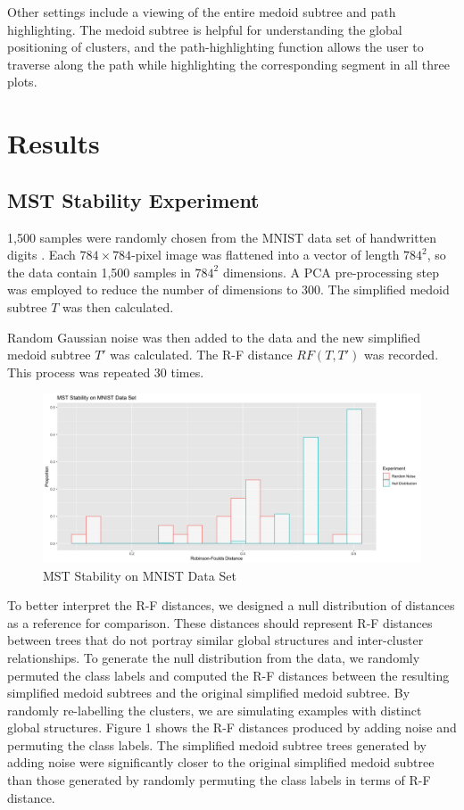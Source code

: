 \documentclass{article}
\begin{document}
Other settings include a viewing of the entire medoid subtree and path highlighting. The medoid subtree is helpful for understanding the global positioning of clusters, and the path-highlighting function allows the user to traverse along the path while highlighting the corresponding segment in all three plots.

\section{Results}

\subsection{MST Stability Experiment}
1,500 samples were randomly chosen from the MNIST data set of handwritten digits \cite{MNIST}. Each $784 \times 784$-pixel image was flattened into a vector of length $784^2$, so the data contain 1,500 samples in $784^2$ dimensions. A PCA pre-processing step was employed to reduce the number of dimensions to 300. The simplified medoid subtree $T$ was then calculated.

Random Gaussian noise was then added to the data and the new simplified medoid subtree $T'$ was calculated. The R-F distance $RF(T, T')$ was recorded. This process was repeated 30 times.

\renewcommand{\figurename}{Figure}
\renewcommand{\thefigure}{1}
\begin{figure}[!t]
\centering
\includegraphics[scale=0.3]{RF stability}
\caption{MST Stability on MNIST Data Set}
\end{figure}

To better interpret the R-F distances, we designed a null distribution of distances as a reference for comparison. These distances should represent R-F distances between trees that do not portray similar global structures and inter-cluster relationships. To generate the null distribution from the data, we randomly permuted the class labels and computed the R-F distances between the resulting simplified medoid subtrees and the original simplified medoid subtree. By randomly re-labelling the clusters, we are simulating examples with distinct global structures. Figure 1 shows the R-F distances produced by adding noise and permuting the class labels. The simplified medoid subtree trees generated by adding noise were significantly closer to the original simplified medoid subtree than those generated by randomly permuting the class labels in terms of R-F distance.
\end{document}
